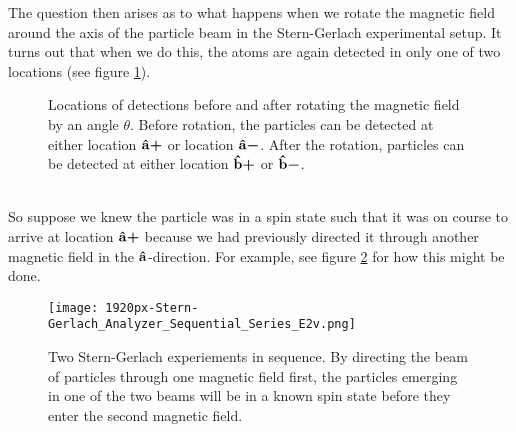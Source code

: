 \documentclass[letter, 12pt]{turabian-thesis}
\theoremstyle{hypothesis}
\newcommand{\uvb}[1]{\vb{\hat{{#1}}}}
\newcommand{\uvbp}[1]{\uvb{#1}\bm{+}}
\newcommand{\uvbm}[1]{\uvb{#1}\bm{-}}
\newcommand{\dotsize}{2pt}
\begin{document}
The question then arises as to what happens when we rotate the magnetic field around the axis of the particle beam in the Stern-Gerlach experimental setup. It turns out that when we do this, the atoms are again detected in only one of two locations (see figure \ref{rotate}).
\begin{figure}[ht!]
\captionsetup{justification=justified}
\centering
\usetikzlibrary {angles, quotes, calc} 
\vspace*{10px}
\caption{Locations of detections before and after rotating the magnetic field by an angle $\theta$. Before rotation, the particles can be detected at either location $\uvbp{a}$ or location $\uvbm{a}$. After the rotation, particles can be detected at either location $\uvbp{b}$ or $\uvbm{b}$. }
\label{rotate}
\end{figure}
\\ \noindent
So suppose we knew the particle was in a spin state such that it was on course to arrive at location $\uvbp{a}$ because we had previously directed it through another magnetic field in the $\uvb{a}$-direction. For example, see figure \ref{knownspin} for how this might be done.
\begin{figure}[ht!]
\captionsetup{justification=centering}
\centering
\texttt{[image: 1920px-Stern-Gerlach\_Analyzer\_Sequential\_Series\_E2v.png]}
\vspace*{10px}
\caption{Two Stern-Gerlach experiements in sequence. By directing the beam of particles through one magnetic field first, the particles emerging in one of the two beams will be in a known spin state before they enter the second magnetic field.\protect\footnotemark}
\label{knownspin}
\end{figure}
\end{document}
